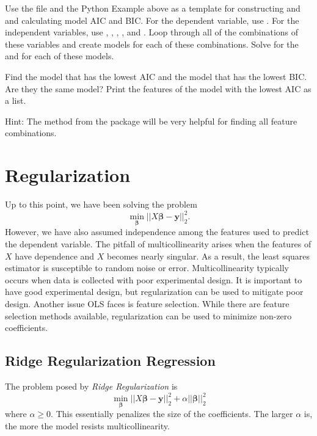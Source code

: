 \begin{problem}
Use the file  and the Python Example above as a template for constructing  and  and calculating model AIC and BIC. 
For the dependent variable, use . 
For the independent variables, use , , , , and .
Loop through all of the combinations of these variables and create  models for each of these combinations.
Solve for the  and  for each of these models.

Find the model that has the lowest AIC and the model that has the lowest BIC. Are they the same model? Print the features of the model with the lowest AIC as a list.

Hint: The  method from the  package will be very helpful for finding all feature combinations. 
\end{problem}

\section*{Regularization}
Up to this point, we have been solving the problem \[ \min_{\boldsymbol\beta} \vert\vert X\boldsymbol\beta - \boldsymbol y \vert\vert_2^2. \]
However, we have also assumed independence among the features used to predict the dependent variable. 
The pitfall of multicollinearity arises when the features of $X$ have dependence and $X$ becomes nearly singular.
As a result, the least squares estimator is susceptible to random noise or error. 
Multicollinearity typically occurs when data is collected with poor experimental design. 
It is important to have good experimental design, but regularization can be used to mitigate poor design. 
Another issue OLS faces is feature selection. 
While there are feature selection methods available, regularization can be used to minimize non-zero coefficients. 

\subsection*{Ridge Regularization Regression}
The problem posed by \textit{Ridge Regularization} is \[ \min_{\boldsymbol\beta} \vert\vert X\boldsymbol\beta - \boldsymbol y \vert\vert_2^2 + \alpha \vert\vert \boldsymbol\beta \vert\vert_2^2 \]
where $\alpha \geq 0$. This essentially penalizes the size of the coefficients.
The larger $\alpha$ is, the more the model resists multicollinearity. 

